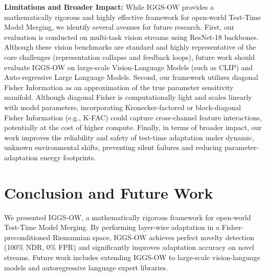 \documentclass{article}
\theoremstyle{plain}
\theoremstyle{definition}
\theoremstyle{remark}
\begin{document}
\textbf{Limitations and Broader Impact:}
While IGGS-OW provides a mathematically rigorous and highly effective framework for open-world Test-Time Model Merging, we identify several avenues for future research. First, our evaluation is conducted on multi-task vision streams using ResNet-18 backbones. Although these vision benchmarks are standard and highly representative of the core challenges (representation collapse and feedback loops), future work should evaluate IGGS-OW on large-scale Vision-Language Models (such as CLIP) and Auto-regressive Large Language Models. Second, our framework utilizes diagonal Fisher Information as an approximation of the true parameter sensitivity manifold. Although diagonal Fisher is computationally light and scales linearly with model parameters, incorporating Kronecker-factored or block-diagonal Fisher Information (e.g., K-FAC) could capture cross-channel feature interactions, potentially at the cost of higher compute. Finally, in terms of broader impact, our work improves the reliability and safety of test-time adaptation under dynamic, unknown environmental shifts, preventing silent failures and reducing parameter-adaptation energy footprints.

\section{Conclusion and Future Work}
\label{sec:conclusion}
We presented IGGS-OW, a mathematically rigorous framework for open-world Test-Time Model Merging. By performing layer-wise adaptation in a Fisher-preconditioned Riemannian space, IGGS-OW achieves perfect novelty detection (100\% NDR, 0\% FPR) and significantly improves adaptation accuracy on novel streams. Future work includes extending IGGS-OW to large-scale vision-language models and autoregressive language expert libraries.



\end{document}
